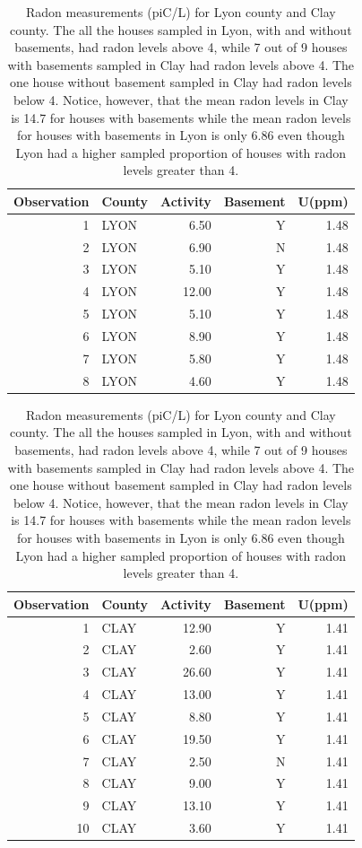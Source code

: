 \documentclass{article}
\begin{document}
\begin{table}[ht]
\centering
\begin{tabular}{rlrrr}
  \hline
  Observation & County & Activity & Basement & U(ppm)\\ 
  \hline
  1 & LYON & 6.50 & Y & 1.48\\ 
  2 & LYON & 6.90 & N & 1.48\\ 
  3 & LYON & 5.10 & Y & 1.48\\ 
  4 & LYON & 12.00& Y & 1.48\\ 
  5 & LYON & 5.10 & Y & 1.48\\ 
  6 & LYON & 8.90 & Y & 1.48\\ 
  7 & LYON & 5.80 & Y & 1.48\\ 
  8 & LYON & 4.60 & Y & 1.48\\ 
   \hline
\end{tabular}
\quad
\centering
\begin{tabular}{rlrrr}
  \hline
  Observation& County & Activity & Basement & U(ppm)\\ 
  \hline
   1 & CLAY & 12.90 & Y & 1.41\\ 
   2 & CLAY & 2.60  & Y & 1.41\\ 
   3 & CLAY & 26.60 & Y & 1.41\\ 
   4 & CLAY & 13.00 & Y & 1.41\\ 
   5 & CLAY & 8.80  & Y & 1.41\\ 
   6 & CLAY & 19.50 & Y & 1.41\\ 
   7 & CLAY & 2.50  & N & 1.41\\ 
   8 & CLAY & 9.00  & Y & 1.41\\ 
   9 & CLAY & 13.10 & Y & 1.41\\ 
  10 & CLAY & 3.60  & Y & 1.41\\ 
   \hline
\end{tabular}
\caption{Radon measurements (piC/L) for Lyon county and Clay county. The all
         the houses sampled in Lyon, with and without basements, had radon
         levels above 4, while 7 out of 9 houses with basements sampled in Clay 
         had radon levels above 4. The one house without basement sampled in Clay
         had radon levels below 4. Notice, however, that the mean radon levels
         in Clay is 14.7 for houses with basements while the mean radon levels
         for houses with basements in Lyon is only 6.86 even though Lyon had
         a higher sampled proportion of houses with radon levels greater than
         4.}
\end{table}
\end{document}
